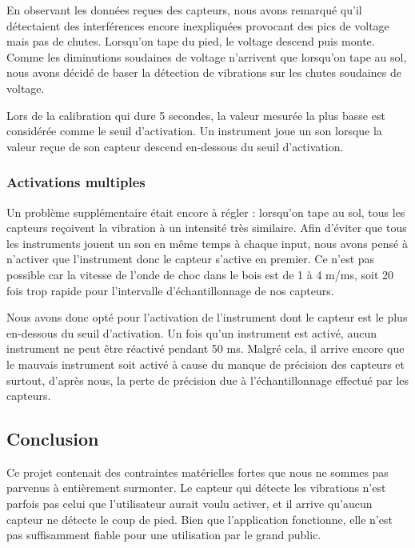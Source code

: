 \documentclass[11pt,a4paper,twoside,svgnames]{article}
\begin{document}
	En observant les données reçues des capteurs, nous avons remarqué qu'il détectaient des interférences encore inexpliquées provocant des pics de voltage mais pas de chutes. Lorsqu'on tape du pied, le voltage descend puis monte. Comme les diminutions soudaines de voltage n'arrivent que lorsqu'on tape au sol, nous avons décidé de baser la détection de vibrations sur les chutes soudaines de voltage.
	
	Lors de la calibration qui dure 5 secondes, la valeur mesurée la plus basse est considérée comme le seuil d'activation. Un instrument joue un son lorsque la valeur reçue de son capteur descend en-dessous du seuil d'activation.
	
	\subsubsection{Activations multiples}
	Un problème supplémentaire était encore à régler : lorsqu'on tape au sol, tous les capteurs reçoivent la vibration à un intensité très similaire. Afin d'éviter que tous les instruments jouent un son en même temps à chaque input, nous avons pensé à n'activer que l'instrument donc le capteur s'active en premier. Ce n'est pas possible car la vitesse de l'onde de choc dans le bois est de 1 à 4 m/ms, soit 20 fois trop rapide pour l'intervalle d'échantillonnage de nos capteurs.
	
	Nous avons donc opté pour l'activation de l'instrument dont le capteur est le plus en-dessous du seuil d'activation. Un fois qu'un instrument est activé, aucun instrument ne peut être réactivé pendant 50 ms. Malgré cela, il arrive encore que le mauvais instrument soit activé à cause du manque de précision des capteurs et surtout, d'après nous, la perte de précision due à l'échantillonnage effectué par les capteurs.
	
	\subsection{Conclusion}
	
	Ce projet contenait des contraintes matérielles fortes que nous ne sommes pas parvenus à entièrement surmonter. Le capteur qui détecte les vibrations n'est parfois pas celui que l'utilisateur aurait voulu activer, et il arrive qu'aucun capteur ne détecte le coup de pied. Bien que l'application fonctionne, elle n'est pas suffisamment fiable pour une utilisation par le grand public.
		
\end{document}
